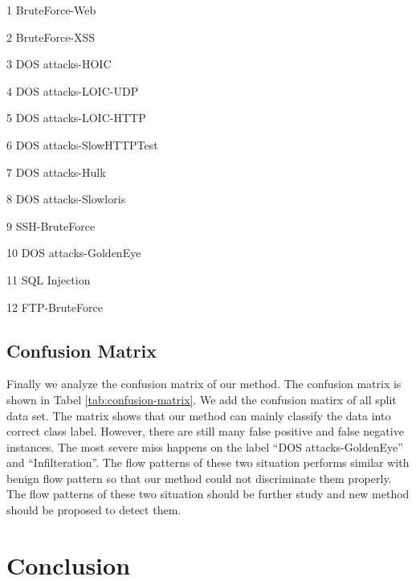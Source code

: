 \documentclass{ieeeaccess}
\theoremstyle{definition}
\begin{document}
\begin{table}
\begin{threeparttable}[b]
\begin{tabularx}{\textwidth}{@{}l*{15}{C}c@{}}
            \bottomrule
        \end{tabularx}
        \begin{tablenotes}
            \item[1] BruteForce-Web
            \item[2] BruteForce-XSS
            \item[3] DOS attacks-HOIC
            \item[4] DOS attacks-LOIC-UDP
            \item[5] DOS attacks-LOIC-HTTP
            \item[6] DOS attacks-SlowHTTPTest
            \item[7] DOS attacks-Hulk
            \item[8] DOS attacks-Slowloris
            \item[9] SSH-BruteForce
            \item[10] DOS attacks-GoldenEye
            \item[11] SQL Injection
            \item[12] FTP-BruteForce
        \end{tablenotes}
    \end{threeparttable}
\end{table}

\subsection{Confusion Matrix}

Finally we analyze the confusion matrix of our method. The confusion matrix is shown in Tabel \ref{tab:confusion-matrix}. We add the confusion matirx of all split data set. The matrix shows that our method can mainly classify the data into correct class label. However, there are still many false positive and false negative instances. The most severe miss happens on the label ``DOS attacks-GoldenEye'' and ``Infilteration''. The flow patterns of these two situation performs similar with benign flow pattern so that our method could not discriminate them properly. The flow patterns of these two situation should be further study and new method should be proposed to detect them.

\section{Conclusion}
\label{sec:conclusion}
\end{document}
